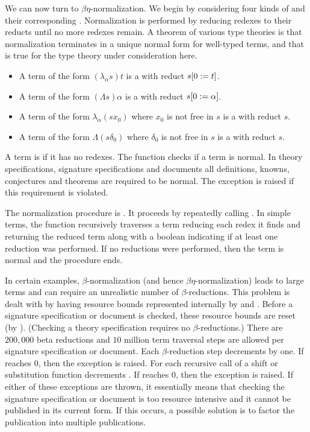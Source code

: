 We can now turn to $\beta\eta$-normalization.
We begin by considering four kinds of {} and their corresponding
{}. Normalization is performed by reducing redexes to their reducts
until no more redexes remain.
A theorem of various type theories is that normalization terminates in a
unique normal form for well-typed terms, and that is true for the type theory
under consideration here.
\begin{itemize}
\item A term of the form $(\lambda_\alpha s)t$
is a {}
with reduct $\dbsub{0}{t}{s}$.
\item A term of the form $(\Lambda s)\alpha$
is a {}
with reduct $\dbsub{0}{\alpha}{s}$.
\item A term of the form $\lambda_\alpha (s x_0)$ where $x_0$ is not free in $s$
is a {}
with reduct $s$.
\item A term of the form $\Lambda (s \delta_0)$ where $\delta_0$ is not free in $s$
is a {}
with reduct $s$.
\end{itemize}
A term is {} if it has no redexes.
The function {} checks if a term is normal.
In theory specifications, signature specifications and documents
all definitions, knowns, conjectures and theorems are required to be normal.
The exception {} is raised if this requirement is violated.

The normalization procedure is {}.
It proceeds by repeatedly calling {}.
In simple terms, the function {} recursively traverses a term
reducing each redex it finds and returning the reduced term along with a boolean
indicating if at least one reduction was performed. If no reductions were performed,
then the term is normal and the procedure ends.

In certain examples, $\beta$-normalization (and hence $\beta\eta$-normalization)
leads to large terms and can require
an unrealistic number of $\beta$-reductions.
This problem is dealt with by having resource bounds
represented internally by {}
and {}.
Before a signature specification or document is checked,
these resource bounds are reset (by {}).
(Checking a theory specification requires no $\beta$-reductions.)
There are $200,000$ beta reductions and $10$ million term traversal steps
are allowed per signature specification or document.
Each $\beta$-reduction step decrements {} by one.
If {} reaches $0$, then the exception {} is raised.
For each recursive call of a shift or substitution function
decrements {}.
If {} reaches $0$, then the exception {} is raised.
If either of these exceptions are thrown, it essentially means that checking
the signature specification or document is too resource intensive and
it cannot be published in its current form.
If this occurs, a possible solution is to factor the publication into multiple publications.

